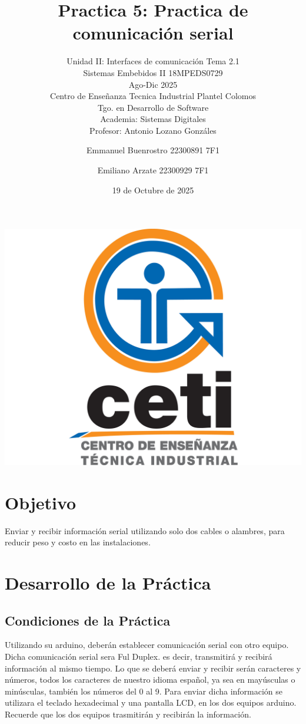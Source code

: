 \documentclass[11pt]{scrartcl}
\title {Practica 5: Practica de comunicación serial}
\subtitle{Unidad II: Interfaces de comunicación Tema 2.1 \\ Sistemas Embebidos II 18MPEDS0729 \\ Ago-Dic 2025 \\ Centro de Enseñanza Tecnica Industrial Plantel Colomos\\Tgo. en Desarrollo de Software \\ Academia: Sistemas Digitales \\Profesor: Antonio Lozano Gonzáles }
\date{19 de Octubre de 2025}
\author{Emmanuel Buenrostro 22300891 7F1 \\ \and Emiliano Arzate 22300929 7F1 \\}
\begin{document}
\maketitle
\begin{center}
   \includegraphics[scale=0.15]{../../cetilogo.jpg} 
\end{center}
\newpage

\section{Objetivo}
 Enviar y recibir información serial utilizando solo dos cables o alambres, para reducir peso y costo en las instalaciones.
\section{Desarrollo de la Práctica}

\subsection{Condiciones de la Práctica}
Utilizando su arduino, deberán establecer comunicación serial con otro equipo. Dicha comunicación serial sera Ful Duplex. es decir, transmitirá y recibirá información al mismo tiempo. Lo que se deberá enviar y recibir serán caracteres y números, todos los caracteres de  nuestro idioma español, ya sea en mayúsculas o minúsculas, también los números del 0 al 9. Para enviar dicha información se utilizara el teclado hexadecimal y una pantalla LCD, en los dos equipos arduino. 
Recuerde que los dos equipos trasmitirán y recibirán la información.
\end{document}
